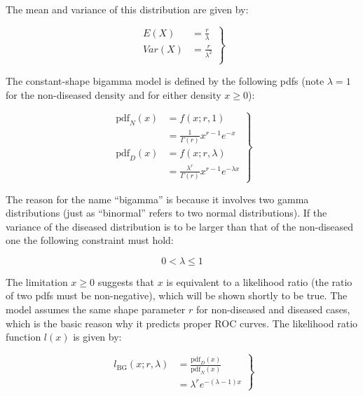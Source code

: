 \documentclass[
]{book}
\begin{document}
The mean and variance of this distribution are given by:

\begin{equation}
\left.\begin{aligned}
E\left( X \right) &= \frac{r}{\lambda} \\
Var\left( X \right) &= \frac{r}{\lambda^2} \\
\end{aligned}\right\}
\label{eq:proper-roc-models-gamma-mean-var}
\end{equation}

The constant-shape bigamma model is defined \citep{dorfman1997proper} by the following pdfs (note \(\lambda = 1\) for the non-diseased density and for either density \(x \ge 0\)):

\begin{equation}
\left.\begin{aligned}
\text{pdf}_N\left( x \right) &= f\left( x;r,1 \right)\\
&= \frac{1}{\Gamma\left( r \right)}x^{r-1}e^{-x}\\
\text{pdf}_D\left( x \right) &= f\left( x;r,\lambda \right)\\
&= \frac{\lambda^r}{\Gamma\left( r \right)}x^{r-1}e^{-\lambda x} 
\end{aligned}\right\}
\label{eq:proper-roc-models-gamma-pdfs}
\end{equation}

The reason for the name ``bigamma'' is because it involves two gamma distributions (just as ``binormal'' refers to two normal distributions). If the variance of the diseased distribution is to be larger than that of the non-diseased one the following constraint must hold:

\begin{equation}
0 < \lambda \le 1
\label{eq:proper-roc-models-bigamma-lambda-inequality}
\end{equation}

The limitation \(x \ge 0\) suggests that \(x\) is equivalent to a likelihood ratio (the ratio of two pdfs must be non-negative), which will be shown shortly to be true. The model assumes the same shape parameter \(r\) for non-diseased and diseased cases, which is the basic reason why it predicts proper ROC curves. The likelihood ratio function \(l(x)\) is given by:

\begin{equation}
\left.\begin{aligned}
l_\text{BG}\left( x;r,\lambda \right) &= \frac{\text{pdf}_D\left( x \right)}{\text{pdf}_N\left( x \right)} \\
&=\lambda^r e^{-\left( \lambda - 1 \right) x}
\end{aligned}\right\}
\label{eq:proper-roc-models-bigamma-likelihood}
\end{equation}
\end{document}
